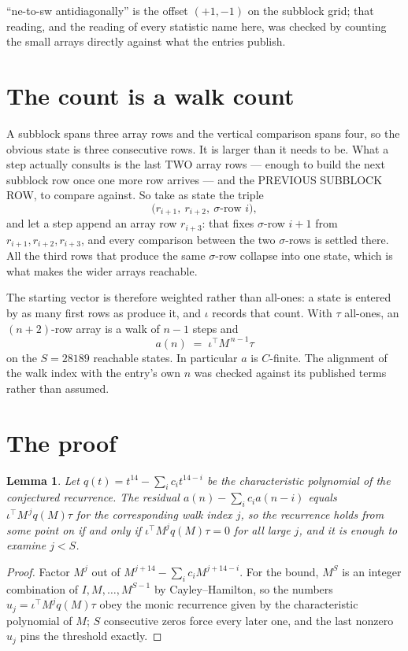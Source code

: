 \documentclass[11pt,a4paper]{article}
\theoremstyle{plain}
\newtheorem{lemma}[theorem]{Lemma}
\theoremstyle{definition}
\begin{document}
``ne-to-sw antidiagonally'' is the offset $(+1,-1)$ on the subblock grid; that reading, and
the reading of every statistic name here, was checked by counting the small arrays directly
against what the entries publish.

\section{The count is a walk count}

A subblock spans three array rows and the vertical comparison spans four, so the obvious state
is three consecutive rows. It is larger than it needs to be. What a step actually consults is
the last TWO array rows --- enough to build the next subblock row once one more row arrives ---
and the PREVIOUS SUBBLOCK ROW, to compare against. So take as state the triple
\[
\bigl(r_{i+1},\ r_{i+2},\ \sigma\text{-row }i\bigr),
\]
and let a step append an array row $r_{i+3}$: that fixes $\sigma$-row $i+1$ from
$r_{i+1},r_{i+2},r_{i+3}$, and every comparison between the two $\sigma$-rows is settled
there. All the third rows that produce the same $\sigma$-row collapse into one state, which is
what makes the wider arrays reachable.

The starting vector is therefore weighted rather than all-ones: a state is entered by as many
first rows as produce it, and $\iota$ records that count. With $\tau$ all-ones, an
$(n+2)$-row array is a walk of $n-1$ steps and
\[
a(n)\;=\;\iota^{\!\top}M^{\,n-1}\tau
\]
on the $S=28189$ reachable states. In particular $a$ is $C$-finite. The alignment of the walk
index with the entry's own $n$ was checked against its published terms rather than assumed.

\section{The proof}

\begin{lemma}\label{lem:crit}
Let $q(t)=t^{14}-\sum_i c_it^{14-i}$ be the characteristic polynomial of the
conjectured recurrence. The residual $a(n)-\sum_ic_ia(n-i)$ equals
$\iota^{\!\top}M^{\,j}q(M)\tau$ for the corresponding walk index $j$, so the recurrence
holds from some point on if and only if $\iota^{\!\top}M^{j}q(M)\tau=0$ for all large $j$,
and it is enough to examine $j<S$.
\end{lemma}

\begin{proof}
Factor $M^{j}$ out of $M^{j+14}-\sum_ic_iM^{j+14-i}$. For the bound, $M^{S}$
is an integer combination of $I,M,\dots,M^{S-1}$ by Cayley--Hamilton, so the numbers
$u_j=\iota^{\!\top}M^{j}q(M)\tau$ obey the monic recurrence given by the characteristic
polynomial of $M$; $S$ consecutive zeros force every later one, and the last nonzero $u_j$
pins the threshold exactly.
\end{proof}
\end{document}
